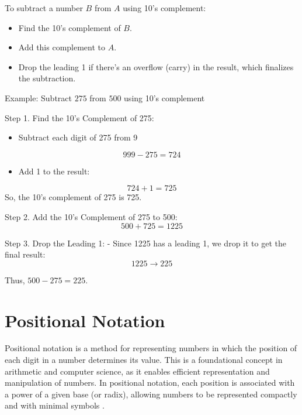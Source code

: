 \vspace{\baselineskip}\par
To subtract a number \( B \) from \( A \) using 10’s complement:
 \begin{itemize}
    \item Find the 10’s complement of \( B \).
    \item Add this complement to \( A \).
    \item Drop the leading 1 if there’s an overflow (carry) in the result, which finalizes the subtraction.
    \end{itemize}
  
\vspace{\baselineskip}\par
Example: Subtract \( 275 \) from \( 500 \) using 10’s complement
\vspace{\baselineskip}\par
Step 1. Find the 10’s Complement of 275:
  \begin{itemize}
    \item Subtract each digit of 275 from 9
  \end{itemize}  
     \[
     999 - 275 = 724
     \]
  \begin{itemize}
    \item Add 1 to the result:
  \end{itemize}
     \[
     724 + 1 = 725
     \]
   So, the 10’s complement of 275 is 725.

\vspace{\baselineskip}\par
Step 2. Add the 10’s Complement of 275 to 500:
   \[
   500 + 725 = 1225
   \]

Step 3. Drop the Leading 1:
   - Since 1225 has a leading 1, we drop it to get the final result:
   \[
   1225 \rightarrow 225
   \]

Thus, \( 500 - 275 = 225 \).


\section{Positional Notation}

Positional notation is a method for representing numbers in which the position of each digit in a number determines its value. This is a foundational concept in arithmetic and computer science, as it enables efficient representation and manipulation of numbers. In positional notation, each position is associated with a power of a given base (or radix), allowing numbers to be represented compactly and with minimal symbols \cite{ross2008}.

